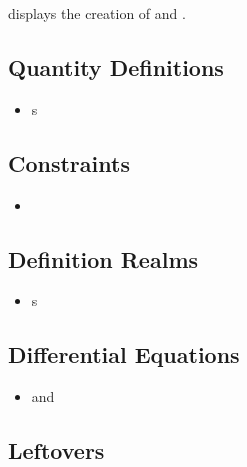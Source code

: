 \currentModelKindsHaskell{}

 displays the creation of \ModelKind{} and
\ModelKinds{}.


\subsection{Quantity Definitions}

\begin{itemize}

	\item \EquationalModel{}s

\end{itemize}

\subsection{Constraints}

\begin{itemize}

	\item \EquationalConstraints{}

\end{itemize}

\subsection{Definition Realms}

\begin{itemize}

	\item \EquationalRealm{}s

\end{itemize}

\subsection{Differential Equations}

\begin{itemize}

	\item \DEModel{} and \NewDEModel{}

\end{itemize}

\subsection{Leftovers}

